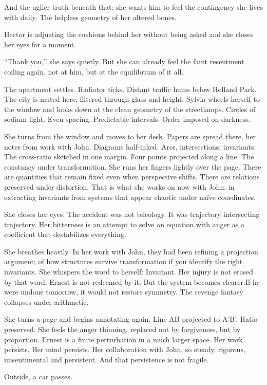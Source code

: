 And the uglier truth beneath that: she wants him to feel the contingency she lives with daily. The helpless geometry of her altered bones.

Hector is adjusting the cushions behind her without being asked and she closes her eyes for a moment.

“Thank you,” she says quietly. But she can already feel the faint resentment coiling again, not at him, but at the equilibrium of it all.

The apartment settles. Radiator ticks. Distant traffic hums below Holland Park. The city is muted here, filtered through glass and height. Sylvia wheels herself to the window and looks down at the clean geometry of the streetlamps. Circles of sodium light. Even spacing. Predictable intervals. Order imposed on darkness.

She turns from the window and moves to her desk. Papers are spread there, her notes from work with John. Diagrams half-inked. Arcs, intersections, invariants. The cross-ratio sketched in one margin. Four points projected along a line. The constancy under transformation. She runs her fingers lightly over the page. There are quantities that remain fixed even when perspective shifts. There are relations preserved under distortion. That is what she works on now with John, in extracting invariants from systems that appear chaotic under naïve coordinates.

She closes her eyes. The accident was not teleology. It was trajectory intersecting trajectory. Her bitterness is an attempt to solve an equation with anger as a coefficient that destabilizes everything.

She breathes heavily. In her work with John, they had been refining a projection argument; of how structures survive transformation if you identify the right invariants.
She whispers the word to herself: Invariant. Her injury is not erased by that word.
Ernest is not redeemed by it. But the system becomes clearer.If he were undone tomorrow, it would not restore symmetry. The revenge fantasy collapses under arithmetic.

She turns a page and begins annotating again. Line AB projected to A'B'. Ratio preserved.
She feels the anger thinning, replaced not by forgiveness, but by proportion. Ernest is a finite perturbation in a much larger space. Her work persists. Her mind persists.
Her collaboration with John, so steady, rigorous, unsentimental and persistent.
And that persistence is not fragile.

Outside, a car passes.

